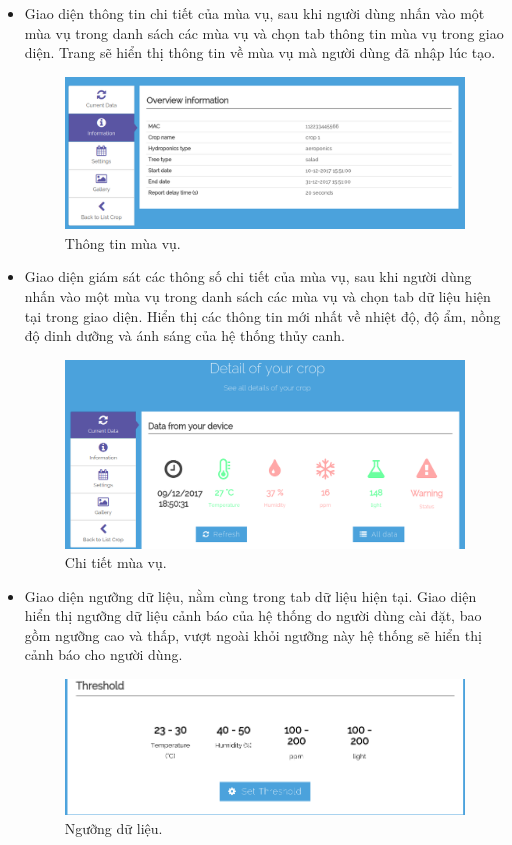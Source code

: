 \documentclass[a4paper,12pt,oneside]{article}
\begin{document}
\begin{itemize}
\item Giao diện thông tin chi tiết của mùa vụ, sau khi người dùng nhấn vào một mùa vụ trong danh sách các mùa vụ và chọn tab thông tin mùa vụ trong giao diện. Trang sẽ hiển thị thông tin về mùa vụ mà người dùng đã nhập lúc tạo.
\begin{figure}[H]
\centering
\includegraphics[scale=.4]{hinh/web_crop_overview.png}
\caption{Thông tin mùa vụ.}
\end{figure}

\item Giao diện giám sát các thông số chi tiết của mùa vụ, sau khi người dùng nhấn vào một mùa vụ trong danh sách các mùa vụ và chọn tab dữ liệu hiện tại trong giao diện. Hiển thị các thông tin mới nhất về nhiệt độ, độ ẩm, nồng độ dinh dưỡng và ánh sáng của hệ thống thủy canh.
\begin{figure}[H]
\centering
\includegraphics[scale=.4]{hinh/web_crop_detail.png}
\caption{Chi tiết mùa vụ.}
\end{figure}

\item Giao diện ngưỡng dữ liệu, nằm cùng trong tab dữ liệu hiện tại. Giao diện hiển thị ngưỡng dữ liệu cảnh báo của hệ thống do người dùng cài đặt, bao gồm ngưỡng cao và thấp, vượt ngoài khỏi ngưỡng này hệ thống sẽ hiển thị cảnh báo cho người dùng.
\begin{figure}[H]
\centering
\includegraphics[scale=.5]{hinh/web_threshold.png}
\caption{Ngưỡng dữ liệu.}
\end{figure}


\end{itemize}
\end{document}
